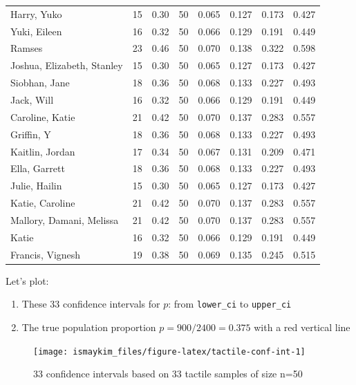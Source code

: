 \documentclass[12pt, krantz2,]{krantz}
\providecommand{\tightlist}{%
  \setlength{\itemsep}{0pt}\setlength{\parskip}{0pt}}
\begin{document}
\begin{longtable}{lrrrrrrr}
Harry, Yuko & 15 & 0.30 & 50 & 0.065 & 0.127 & 0.173 & 0.427\\
Yuki, Eileen & 16 & 0.32 & 50 & 0.066 & 0.129 & 0.191 & 0.449\\
\addlinespace
Ramses & 23 & 0.46 & 50 & 0.070 & 0.138 & 0.322 & 0.598\\
Joshua, Elizabeth, Stanley & 15 & 0.30 & 50 & 0.065 & 0.127 & 0.173 & 0.427\\
Siobhan, Jane & 18 & 0.36 & 50 & 0.068 & 0.133 & 0.227 & 0.493\\
Jack, Will & 16 & 0.32 & 50 & 0.066 & 0.129 & 0.191 & 0.449\\
Caroline, Katie & 21 & 0.42 & 50 & 0.070 & 0.137 & 0.283 & 0.557\\
\addlinespace
Griffin, Y & 18 & 0.36 & 50 & 0.068 & 0.133 & 0.227 & 0.493\\
Kaitlin, Jordan & 17 & 0.34 & 50 & 0.067 & 0.131 & 0.209 & 0.471\\
Ella, Garrett & 18 & 0.36 & 50 & 0.068 & 0.133 & 0.227 & 0.493\\
Julie, Hailin & 15 & 0.30 & 50 & 0.065 & 0.127 & 0.173 & 0.427\\
Katie, Caroline & 21 & 0.42 & 50 & 0.070 & 0.137 & 0.283 & 0.557\\
\addlinespace
Mallory, Damani, Melissa & 21 & 0.42 & 50 & 0.070 & 0.137 & 0.283 & 0.557\\
Katie & 16 & 0.32 & 50 & 0.066 & 0.129 & 0.191 & 0.449\\
Francis, Vignesh & 19 & 0.38 & 50 & 0.069 & 0.135 & 0.245 & 0.515\\*
\end{longtable}
\endgroup{}

Let's plot:

\begin{enumerate}
\def\labelenumi{\arabic{enumi}.}
\tightlist
\item
  These 33 confidence intervals for \(p\): from \texttt{lower\_ci} to \texttt{upper\_ci}
\item
  The true population proportion \(p = 900 / 2400 = 0.375\) with a red vertical line
\end{enumerate}

\begin{figure}

{\centering \texttt{[image: ismaykim\_files/figure-latex/tactile-conf-int-1]} 

}

\caption{33 confidence intervals based on 33 tactile samples of size n=50}\label{fig:tactile-conf-int}
\end{figure}
\end{document}
